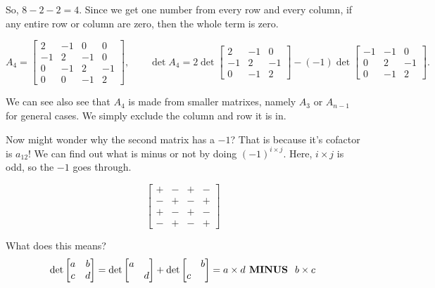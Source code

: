 So, \(8 -2 -2 = 4\). Since we get one number from every row and every column, if any entire row or column are zero, then the whole term is zero. 

\[
A_4=
\begin{bmatrix}
2 & -1 & 0 & 0\\
-1 & 2 & -1 & 0\\
0 & -1 & 2 & -1\\
0 & 0 & -1 & 2
\end{bmatrix},
\qquad
\det A_4
= 2 \det\!\begin{bmatrix}
2 & -1 & 0\\
-1 & 2 & -1\\
0 & -1 & 2
\end{bmatrix}
- (-1)\det\!\begin{bmatrix}
-1 & -1 & 0\\
0 & 2 & -1\\
0 & -1 & 2
\end{bmatrix}.
\]


We can see also see that \(A_4\) is made from smaller matrixes, namely \(A_3\) or \(A_{n-1} \) for general cases. We simply exclude the column and row it is in.  

Now might wonder why the second matrix has a \(-1\)? That is because it's cofactor is  \(a_{12} \)! We can find out what is minus or not by doing \((-1)^{i \times j}\). Here, \(i \times j\) is odd, so the \(-1\) goes through.    


\[
\begin{bmatrix}
+ & - & + & -\\
- & + & - & +\\
+ & - & + & -\\
- & + & - & +
\end{bmatrix}
\]


What does this means?
\[
  \det \begin{bmatrix}
    a & b  \\
    c & d  \\
  \end{bmatrix}
  = \det  
  \begin{bmatrix}
    a &   \\
     & d  \\
  \end{bmatrix}
  + 
  \det  
  \begin{bmatrix}
     & b  \\
    c &   \\
  \end{bmatrix}
  = a \times d \text{\textbf{ MINUS } } b \times c
\]

